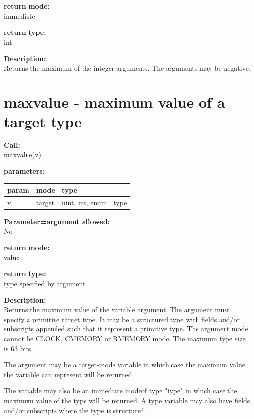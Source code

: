         {\bf return mode:} \\
        immediate

        {\bf return type:} \\
        int
        
        {\bf Description:} \\
        Returns the maximum of the integer arguments. The arguments may
        be negative.


    \section{maxvalue - maximum value of a target type}\label{sec:ifmaxvalue}
        
        
        {\bf Call:} \\
        maxvalue(v)
        
        {\bf parameters:} \\
        \begin{tabular}{| l | l | l | l |}
        \hline
        param  & mode & type & \\
        \hline \hline
        v & target & uint, int, enum & type    \\ \hline
        \end{tabular}
        
        {\bf Parameter=argument allowed:} \\
        No
        
        {\bf return mode:} \\
        value

        {\bf return type:} \\
        type specified by argument
        
        {\bf Description:} \\
        Returns the maximum value of the variable argument. The argument must
        specify a primitive target type. It may be a structured type with fields
        and/or subscripts appended such that it represent a primitive type. The
        argument mode cannot be CLOCK, CMEMORY or RMEMORY mode. The maximum type
        size is 63 bits.

        The argument may be a target-mode variable in which case the maximum
        value the variable can represent will be returned.

        The variable may also be an immediate modeof type "type" in which case
        the maximum value of the type will be returned. A type variable may also
        have fields and/or subscripts where the type is structured.

